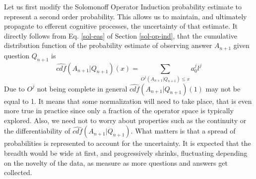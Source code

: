 \documentclass[runningheads]{llncs}
\begin{document}
Let us first modify the Solomonoff Operator Induction probability
estimate to represent a second order probability. This allows us to
maintain, and ultimately propagate to efferent cognitive processes,
the uncertainty of that estimate.
It directly follows from Eq. \ref{sol-eas} of Section
\ref{sol-op-ind}, that the cumulative distribution function of the
probability estimate of observing answer $A_{n+1}$ given question
$Q_{n+1}$ is
\begin{equation}
  \label{sol-cdf}
\hat{cdf}(A_{n+1}|Q_{n+1})(x) = \sum_{O^j(A_{n+1}|Q_{n+1}) \le x} a_0^j l^j
\end{equation}
Due to $O^j$ not being complete in general
$\hat{cdf}(A_{n+1}|Q_{n+1})(1)$ may not be equal to 1. It means that
some normalization will need to take place, that is even more true in
practice since only a fraction of the operator space is typically
explored. Also, we need not to worry about properties such as the
continuity or the differentiability of
$\hat{cdf}(A_{n+1}|Q_{n+1})$. What matters is that a spread of
probabilities is represented to account for the uncertainty. It is
expected that the breadth would be wide at first, and progressively
shrinks, fluctuating depending on the novelty of the data, as measure
as more questions and answers get collected.
\end{document}
